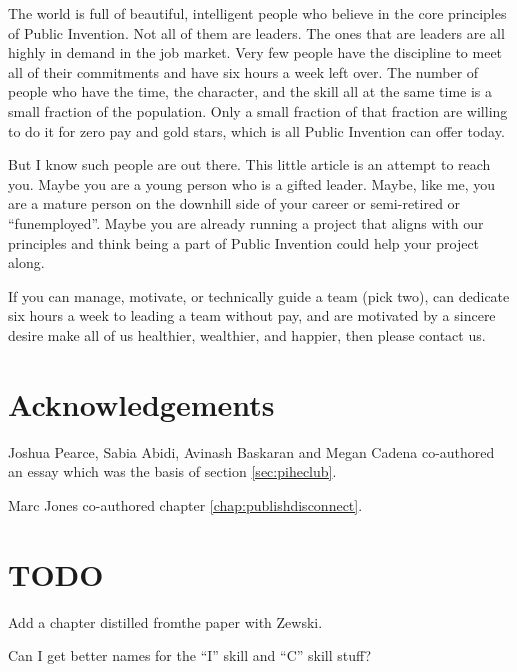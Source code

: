 \documentclass[
	fontsize=10pt, %
	twoside=false, %
	secnumdepth=1, %
]{kaobook}
\begin{document}
The world is full of beautiful, intelligent people who believe in the
core principles of Public Invention. Not all of them are leaders. The
ones that are leaders are all highly in demand in the job market. Very
few people have the discipline to meet all of their commitments and
have six hours a week left over. The number of people who have the
time, the character, and the skill all at the same time is a small
fraction of the population. Only a small fraction of that fraction are
willing to do it for zero pay and gold stars, which is all Public
Invention can offer today.

But I know such people are out there. This little article is an
attempt to reach you. Maybe you are a young person who is a gifted
leader. Maybe, like me, you are a mature person on the downhill side
of your career or semi-retired or “funemployed”. Maybe you are already
running a project that aligns with our principles and think being a
part of Public Invention could help your project along.

If you can manage, motivate, or technically guide a team (pick two),
can dedicate six hours a week to leading a team without pay, and are
motivated by a sincere desire make all of us healthier, wealthier, and
happier, then please contact us.


\appendix %



\chapter*{Acknowledgements}

Joshua Pearce, Sabia Abidi, Avinash Baskaran and Megan Cadena co-authored an essay which was the basis of section \ref{sec:piheclub}.

Marc Jones co-authored chapter \ref{chap:publishdisconnect}.

\chapter*{TODO}

Add a chapter distilled fromthe paper with Zewski.

Can I get better names for the ``I'' skill and ``C'' skill stuff?


\backmatter %
\end{document}
